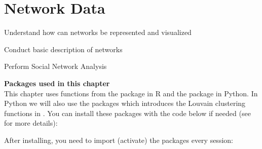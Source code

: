 \chapter{Network Data}
\label{chap:network}

\begin{abstract}{Abstract}
  
Especially social media data, but also other types of data can often be represented as networks. This chapter introduces  (R+Python) and  (Python) to showcase how to deal with such data, perform Social Network Analysis (SNA) and represent it visually. 
\end{abstract}


\begin{objectives}
\item Understand how can networks be represented and visualized
\item Conduct basic description of networks
\item Perform Social Network Analysis
\end{objectives}



\newpage
\begin{feature}
  \textbf{Packages used in this chapter}\\
  This chapter uses functions from the package  in R and the package  in Python.
  In Python we will also use the  packages which introduces the Louvain clustering functions in .
  You can install these packages with the code below if needed  (see  for more details):


\noindent After installing, you need to import (activate) the packages every session:

\end{feature}




